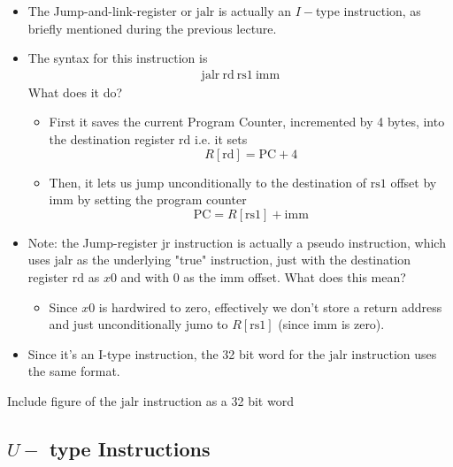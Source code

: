 \documentclass[11pt]{article}
\begin{document}
\begin{itemize}
  \item The Jump-and-link-register or $\mathrm{jalr}$ is actually an $I-$type instruction, as briefly mentioned during the previous lecture.
  
  \item The syntax for this instruction is 
  \begin{align*}
    \mathrm{jalr} ~ \mathrm{rd} ~ \mathrm{rs1} ~ \mathrm{imm}
  \end{align*} What does it do? 

  \begin{itemize}
    \item First it saves the current Program Counter, incremented by 4 bytes, into the destination register $\mathrm{rd}$ i.e. it sets $$ R[\mathrm{rd}] = \mathrm{PC} + 4 $$
    \item Then, it lets us jump unconditionally to the destination of $\mathrm{rs1}$ offset by $\mathrm{imm}$ by setting the program counter $$\mathrm{PC} = R[\mathrm{rs1}] + \mathrm{imm}$$
  \end{itemize}
  
  \item Note: the Jump-register $\mathrm{jr}$ instruction is actually a pseudo instruction, which uses $\mathrm{jalr}$ as the underlying "true" instruction, just with the destination register $\mathrm{rd}$ as $x0$ and with $0$ as the $\mathrm{imm}$ offset. What does this mean?
  
  \begin{itemize}
    \item Since $x0$ is hardwired to zero, effectively we don't store a return address and just unconditionally jumo to $R[\mathrm{rs1}]$ (since $\mathrm{imm}$ is zero).
  \end{itemize}

  \item Since it's an I-type instruction, the 32 bit word for the $\mathrm{jalr}$ instruction uses the same format.
\end{itemize}

\begin{center}
  Include figure of the $\mathrm{jalr}$ instruction  as a 32 bit word
\end{center}

\vskip 1cm
\subsection{$U-$ type Instructions}
\end{document}
